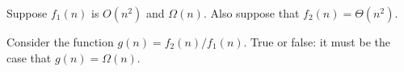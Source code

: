 \begin{prob}
    Suppose $f_1(n)$ is  $O(n^2)$ and $\Omega(n)$. Also suppose that $f_2(n) = \Theta(n^2)$.

    Consider the function $g(n) = f_2(n) / f_1(n)$. True or false: it must be 
    the case that $g(n) = \Omega(n)$.
    \tF{}
\end{prob}

